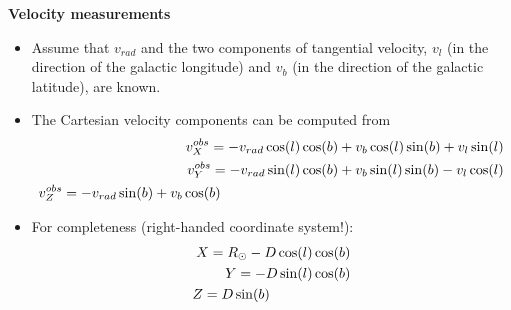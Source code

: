 \documentclass[letterpaper,landscape]{slides}
\begin{document}
\begin{slide}

\begin{center}
\bfseries
\large {} Velocity measurements 
\end{center}
\vskip 0.2in
\begin{itemize}
\item Assume that $v_{rad}$ and the two components of tangential 
velocity, $v_l$ (in the direction of the galactic longitude) and
$v_b$ (in the direction of the galactic latitude), are known.
\item The Cartesian velocity components can be computed from 
\begin{eqnarray} 
 v_X^{obs} = -v_{rad} \cos(l) \cos(b) + v_b \cos(l) \sin(b) + v_l \sin(l) \nonumber \\
 v_Y^{obs} = -v_{rad} \sin(l) \cos(b) + v_b \sin(l) \sin(b) - v_l \cos(l) \nonumber \\
 v_Z^{obs} = -v_{rad} \sin(b) + v_b \cos(b)   \hskip 2.8in                            \nonumber
\end{eqnarray} 
\item For completeness (right-handed coordinate system!): 
\begin{eqnarray} 
   X = R_\odot - D \cos(l) \cos(b)  \nonumber \\
   Y = -D \sin(l) \cos(b) \nonumber \\
   Z = D\sin(b)  \hskip 0.8in                            \nonumber
\end{eqnarray} 
\end{itemize}    
\vfill

\end{slide}


\end{document}
